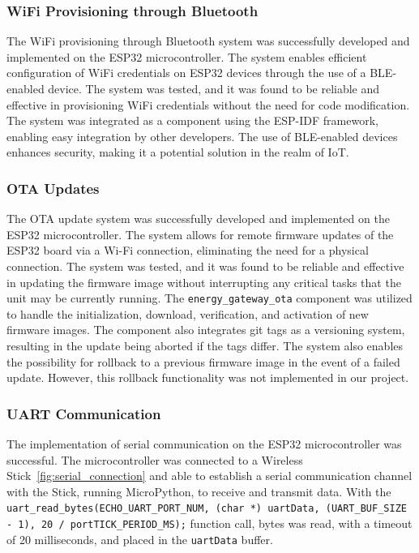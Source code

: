 \subsubsection{WiFi Provisioning through Bluetooth}

The WiFi provisioning through Bluetooth system was successfully developed and implemented on the ESP32 microcontroller. The system enables efficient configuration of WiFi credentials on ESP32 devices through the use of a BLE-enabled device. The system was tested, and it was found to be reliable and effective in provisioning WiFi credentials without the need for code modification. The system was integrated as a component using the ESP-IDF framework, enabling easy integration by other developers. The use of BLE-enabled devices enhances security, making it a potential solution in the realm of IoT.

\subsubsection{OTA Updates}

The OTA update system was successfully developed and implemented on the ESP32 microcontroller. The system allows for remote firmware updates of the ESP32 board via a Wi-Fi connection, eliminating the need for a physical connection. The system was tested, and it was found to be reliable and effective in updating the firmware image without interrupting any critical tasks that the unit may be currently running. The \texttt{energy\_gateway\_ota} component was utilized to handle the initialization, download, verification, and activation of new firmware images. The component also integrates git tags as a versioning system, resulting in the update being aborted if the tags differ. The system also enables the possibility for rollback to a previous firmware image in the event of a failed update. However, this rollback functionality was not implemented in our project.

\subsubsection{UART Communication}

The implementation of serial communication on the ESP32 microcontroller was successful. The microcontroller was connected to a Wireless Stick~\ref{fig:serial_connection} and able to establish a serial communication channel with the Stick, running MicroPython, to receive and transmit data. With the \texttt{uart\_read\_bytes(ECHO\_UART\_PORT\_NUM, (char *) uartData, (UART\_BUF\_SIZE - 1), 20 / portTICK\_PERIOD\_MS);} function call, bytes was read, with a timeout of 20 milliseconds, and placed in the \texttt{uartData} buffer. 


